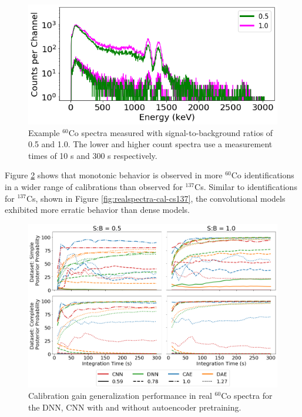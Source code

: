 \begin{figure}[H]
	\centering
	\includegraphics[width=0.85\linewidth]{images/realspectra-cal-co60-spec}
	\caption{Example $^{60}$Co spectra measured with signal-to-background ratios of 0.5 and 1.0. The lower and higher count spectra use a measurement times of 10 s and 300 s respectively.}
	\label{fig:realspectra-cal-co60-spec}
\end{figure}

Figure \ref{fig:realspectra-cal-co60} shows that monotonic behavior is observed in more $^{60}$Co identifications in a wider range of calibrations than observed for $^{137}$Cs. Similar to identifications for $^{137}$Cs, shown in Figure \ref{fig:realspectra-cal-cs137}, the convolutional models exhibited more erratic behavior than dense models.

\begin{figure}[H]
	\centering
	\includegraphics[width=1.0\linewidth]{images/realspectra-cal-co60}
	\caption{Calibration gain generalization performance in real $^{60}$Co spectra for the DNN, CNN with and without autoencoder pretraining.}
	\label{fig:realspectra-cal-co60}
\end{figure}

